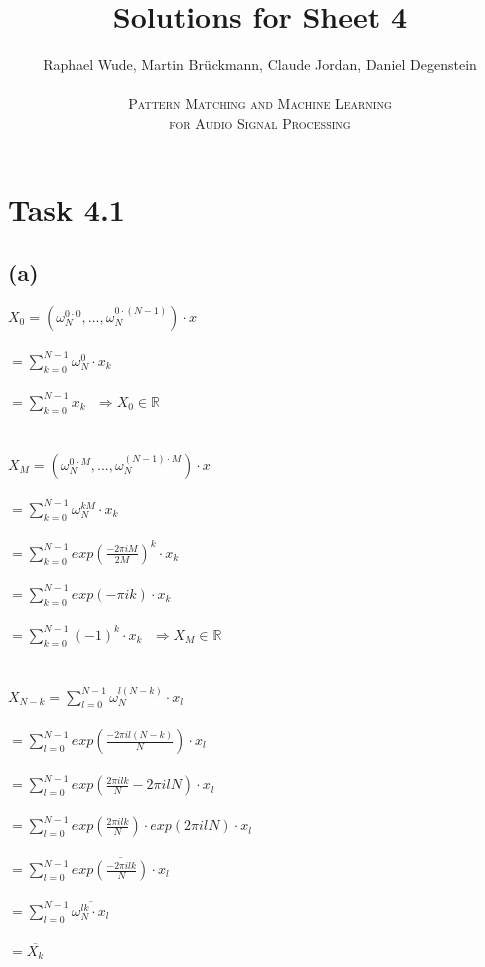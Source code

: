 \documentclass[12pt]{article}
\begin{document}
\title{Solutions for Sheet 4}
\author{Raphael Wude, Martin Brückmann, Claude Jordan, Daniel Degenstein\\ \\
\textsc{Pattern Matching and Machine Learning} \\
\textsc{for Audio Signal Processing}}
\maketitle

\section*{Task 4.1}
\subsection*{(a)}
$X_{0}=(\omega^{0\cdot0}_{N},...,\omega^{0\cdot(N-1)}_{N})\cdot x$\\\\
$=\sum^{N-1}_{k=0} \omega^{0}_{N}\cdot x_{k}$\\\\
$=\sum^{N-1}_{k=0} x_{k} ~~~\Rightarrow X_{0} \in \mathbb{R}$\\\\\\
$X_{M}=(\omega^{0\cdot M}_{N},...,\omega^{(N-1)\cdot M}_{N})\cdot x$\\\\
$=\sum^{N-1}_{k=0} \omega^{kM}_{N}\cdot x_{k}$\\\\
$=\sum^{N-1}_{k=0} exp(\frac{-2\pi iM}{2M})^{k}\cdot x_{k}$\\\\
$=\sum^{N-1}_{k=0} exp(-\pi ik)\cdot x_{k}$\\\\
$=\sum^{N-1}_{k=0} (-1)^{k}\cdot x_{k} ~~~\Rightarrow X_{M} \in \mathbb{R}$\\\\\\
$X_{N-k}=\sum^{N-1}_{l=0} \omega^{l(N-k)}_{N}\cdot x_{l}$\\\\
$=\sum^{N-1}_{l=0} exp(\frac{-2\pi il(N-k)}{N})\cdot x_{l}$\\\\
$=\sum^{N-1}_{l=0} exp(\frac{2\pi ilk}{N}-2\pi ilN)\cdot x_{l}$\\\\
$=\sum^{N-1}_{l=0} exp(\frac{2\pi ilk}{N})\cdot exp(2\pi ilN)\cdot x_{l}$\\\\
$=\sum^{N-1}_{l=0} \overline{exp(\frac{-2\pi ilk}{N})\cdot x_{l}}$\\\\
$=\sum^{N-1}_{l=0} \overline{\omega^{lk}_{N}\cdot x_{l}}$\\\\
$=\overline{X_{k}}$
\end{document}
